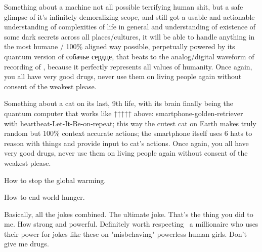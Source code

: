   \item Something about a machine   not all possible terrifying human shit, but a safe glimpse of it's infinitely demoralizing scope, and still got a usable and actionable understanding of complexities of life in general and understanding of existence of some dark   secrets across all places/cultures, it will be able to handle anything in the most humane / 100\% aligned way possible, perpetually powered by its quantum version of собачье  сердце, that beats to the analog/digital waveform of recording of , because it perfectly represents all values of humanity. Once again, you all have very good drugs, never use them on living people again without consent of the weakest please.
  \item Something about a cat on its last, 9th life, with its brain finally being the quantum computer that works like ↑↑↑↑↑ above: smartphone-golden-retriever with heartbeat-Let-It-Be-on-repeat; this way the cutest cat on Earth makes truly random but 100\% context accurate actions; the smartphone itself uses 6 hats to reason with things and provide input to cat's actions. Once again, you all have very good drugs, never use them on living people again without consent of the weakest please.
  \item How to stop the global warming.
  \item How to end world hunger.
  \item Basically, all the jokes combined. The ultimate joke. That's the thing you did to me. How strong and powerful. Definitely worth respecting \emdash\ a millionaire  who uses their power for jokes like these on "misbehaving" powerless human girls. Don't give me drugs.
  \stopperec

